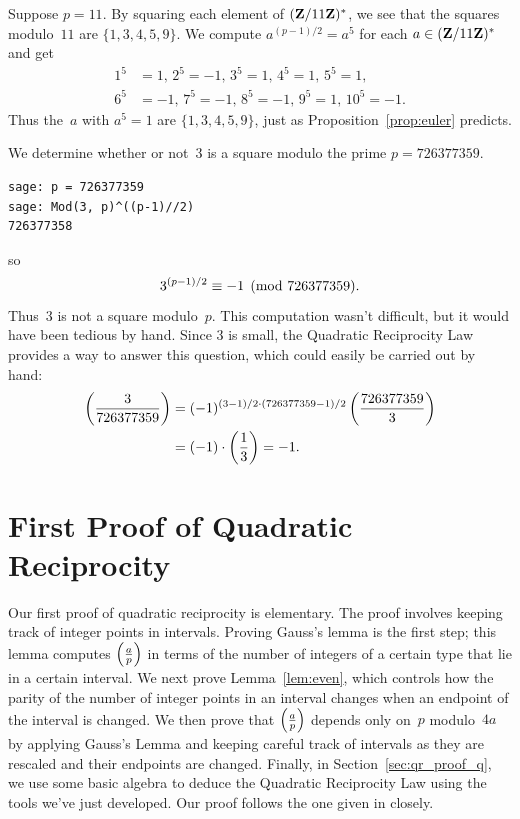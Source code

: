 \begin{example}
Suppose $p=11$.  By squaring each element of $(\mathbf{Z}/11\mathbf{Z}{})^*$, we see
that the squares modulo~$11$ are $\{1,3,4,5,9\}$.
We compute $a^{(p-1)/2}=a^{5}$ for each $a\in (\mathbf{Z}/11\mathbf{Z}{})^*$ and get
\begin{align*}
 1^{5} &= 1,\, 2^{5} = -1,\, 3^{5} = 1,\, 4^{5} = 1,\, 5^{5} = 1,\, \\
 6^{5} &= -1,\, 7^{5} = -1,\, 8^{5} = -1,\, 9^{5} = 1,\, 10^{5} = -1.
\end{align*}
Thus the~$a$ with $a^5=1$ are $\{1, 3, 4, 5, 9\}$,
just as Proposition~\ref{prop:euler} predicts.
\end{example}



\begin{example}
We determine whether or not~$3$ is a square modulo the prime $p=726377359$.
\begin{verbatim}
sage: p = 726377359
sage: Mod(3, p)^((p-1)//2)
726377358
\end{verbatim}
so
$$
3^{(p-1)/2}\equiv -1\pmod{726377359}.
$$
Thus~$3$ is not a square modulo~$p$.  This computation wasn't difficult, but
it would have been tedious by hand.  Since $3$ is small,
the Quadratic Reciprocity Law
provides a way to answer this question, which could easily be carried
out by hand:
\begin{align*}
 \left(\frac{3}{726377359}\right)
  &= (-1)^{(3-1)/2\cdot (726377359-1)/2} \left(\frac{726377359}{3}\right)\\
  &= (-1) \cdot \left(\frac{1}{3}\right) = -1.
\end{align*}
\end{example}


\section{First Proof of Quadratic Reciprocity}\label{sec:qr1}

Our first proof of quadratic reciprocity is elementary.  The proof
involves keeping track of integer points in intervals.  Proving
Gauss's lemma is the first step; this lemma computes
$\left(\frac{a}{p}\right)$ in terms of the number of integers of a certain type that
lie in a certain interval.  We next prove Lemma~\ref{lem:even}, which
controls how the parity of the number of integer points in an interval
changes when an endpoint of the interval is changed.  We then prove
that $\left(\frac{a}{p}\right)$ depends only on~$p$ modulo~$4a$ by applying
Gauss's Lemma and keeping careful track of intervals as
they are rescaled and their endpoints are changed.  Finally, in
Section~\ref{sec:qr_proof_q}, we use some basic algebra to deduce the
Quadratic Reciprocity Law using the tools we've just developed.
Our proof follows the one given in \cite{davenport} closely.

